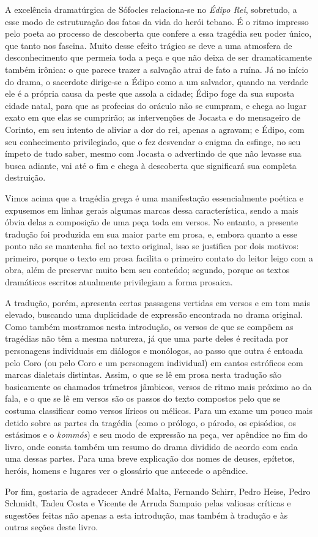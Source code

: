 A excelência dramatúrgica de Sófocles relaciona-se no \emph{Édipo Rei},
sobretudo, a esse modo de estruturação dos fatos da vida do herói
tebano. É o ritmo impresso pelo poeta ao processo de descoberta que
confere a essa tragédia seu poder único, que tanto nos fascina. Muito
desse efeito trágico se deve a uma atmosfera de desconhecimento que
permeia toda a peça e que não deixa de ser dramaticamente também
irônica: o que parece trazer a salvação atrai de fato a ruína. Já no
início do drama, o sacerdote dirige-se a Édipo como a um salvador,
quando na verdade ele é a própria causa da peste que assola a cidade;
Édipo foge da sua suposta cidade natal, para que as profecias do oráculo
não se cumpram, e chega ao lugar exato em que elas se cumprirão; as
intervenções de Jocasta e do mensageiro de Corinto, em seu intento de
aliviar a dor do rei, apenas a agravam; e Édipo, com seu conhecimento
privilegiado, que o fez desvendar o enigma da esfinge, no seu ímpeto de
tudo saber, mesmo com Jocasta o advertindo de que não levasse sua busca
adiante, vai até o fim e chega à descoberta que significará sua completa
destruição.

\begin{center}\asterisc{}\end{center}


Vimos acima que a tragédia grega é uma manifestação essencialmente
poética e expusemos em linhas gerais algumas marcas dessa
característica, sendo a mais óbvia delas a composição de uma peça toda
em versos. No entanto, a presente tradução foi produzida em sua maior
parte em prosa, e, embora quanto a esse ponto não se mantenha fiel ao
texto original, isso se justifica por dois motivos: primeiro, porque o
texto em prosa facilita o primeiro contato do leitor leigo com a obra,
além de preservar muito bem seu conteúdo; segundo, porque os textos
dramáticos escritos atualmente privilegiam a forma prosaica.

A tradução, porém, apresenta certas passagens vertidas em versos e em
tom mais elevado, buscando uma duplicidade de expressão encontrada no
drama original. Como também mostramos nesta introdução, os versos de que
se compõem as tragédias não têm a mesma natureza, já que uma parte deles
é recitada por personagens individuais em diálogos e monólogos, ao passo
que outra é entoada pelo Coro (ou pelo Coro e um personagem individual)
em cantos estróficos com marcas dialetais distintas. Assim, o que se lê
em prosa nesta tradução são basicamente os chamados trímetros jâmbicos,
versos de ritmo mais próximo ao da fala, e o que se lê em versos são os
passos do texto compostos pelo que se costuma classificar como versos
líricos ou mélicos. Para um exame um pouco mais detido sobre as partes
da tragédia (como o prólogo, o párodo, os episódios, os estásimos e o
\emph{kommós}) e seu modo de expressão na peça, ver apêndice no fim do
livro, onde consta também um resumo do drama dividido de acordo com cada
uma dessas partes. Para uma breve explicação dos nomes de deuses,
epítetos, heróis, homens e lugares ver o glossário que antecede o
apêndice.

Por fim, gostaria de agradecer André Malta, Fernando Schirr, Pedro
Heise, Pedro Schmidt, Tadeu Costa e Vicente de Arruda Sampaio pelas
valiosas críticas e sugestões feitas não apenas a esta introdução, mas
também à tradução e às outras seções deste livro.